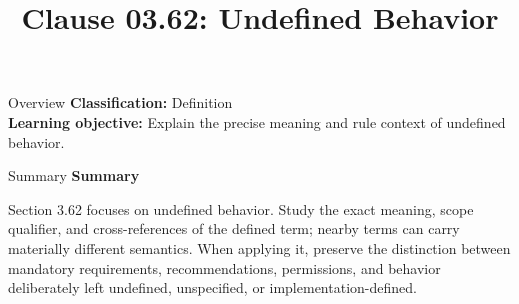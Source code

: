 \documentclass[10pt,letterpaper]{article}
\title{Clause 03.62: Undefined Behavior}
\author{}
\date{}
\begin{document}
\maketitle
\begin{CornellOverviewBox}{Overview}
\textbf{Classification:} Definition\\[2pt]
\textbf{Learning objective:} Explain the precise meaning and rule context of undefined behavior.
\end{CornellOverviewBox}\begin{CornellSummaryBox}{Summary}
{\sffamily\bfseries\color{Accent} Summary}\par\vspace{3pt}Section 3.62 focuses on undefined behavior. Study the exact meaning, scope qualifier, and cross-references of the defined term; nearby terms can carry materially different semantics. When applying it, preserve the distinction between mandatory requirements, recommendations, permissions, and behavior deliberately left undefined, unspecified, or implementation-defined.
\end{CornellSummaryBox}
\end{document}
